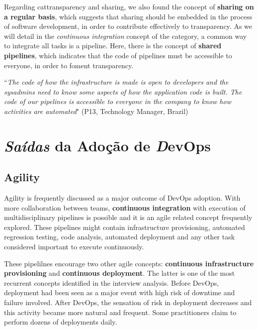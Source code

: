 Regarding cat{transparency and sharing}, we also found the concept of \textbf{sharing on a regular basis}, which suggests
that sharing should be embedded in the process of software
development, in order to contribute effectively to transparency.
As we will detail in the \emph{continuous integration} concept of
the  category, a common way to integrate all tasks is a pipeline. Here, there is the
concept of \textbf{shared pipelines}, which indicates that the code of pipelines
must be accessible to everyone, in order to foment transparency.

\begin{mq}
``\emph{The code of how the infrastructure is
made is open to developers and the sysadmins need to know some aspects of how
the application code is built. The code of our pipelines is accessible to
everyone in the company to know how activities are automated}" (P13, Technology
Manager, Brazil)
\end{mq}


\section{\emph{Saídas} da Adoção de {\emph DevOps}}\label{secao_saidas}


\subsection{Agility}

Agility is frequently discussed as a major outcome of DevOps adoption. With more
collaboration between teams, \textbf{continuous integration} with execution of
multidisciplinary pipelines is possible and it is an agile related concept
frequently explored. These pipelines might contain
infrastructure provisioning, automated regression testing, code analysis,
automated deployment and any other task considered important to
execute continuously.

These pipelilnes encourage two other agile concepts: \textbf{continuous
infrastructure provisioning} and \textbf{continuous deployment}. The latter is
one of the most recurrent concepts identified in the interview analysis. Before
DevOps, deployment had been seen as a major event with high risk of downtime and
failure involved. After DevOps, the sensation of risk in deployment decreases
and this activity became more natural and frequent. Some practitioners claim
to perform dozens of deployments daily.

